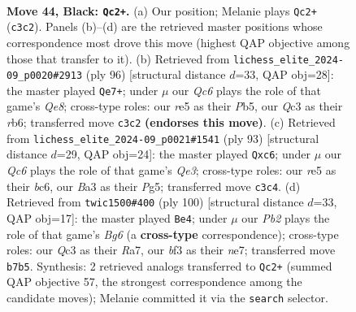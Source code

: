 \documentclass[11pt]{article}
\begin{document}
\clearpage

\begin{figure}[p]\centering
\begin{subfigure}{0.46\textwidth}\centering
\resizebox{\linewidth}{!}{%
\newchessgame
\chessboard[
  setfen={8/pp6/6pk/4R3/5P1P/b1q2B2/5K2/8 b - - 1 44},
  showmover=false,
  pgfstyle=straightmove, color=movearrow, markmove={c3-c2}
]}
\caption{}
\end{subfigure}\hfill
\begin{subfigure}{0.46\textwidth}\centering
\resizebox{\linewidth}{!}{%
\newchessgame
\chessboard[
  setfen={1b2Q3/6k1/1r6/1P3p2/5P2/5KP1/8/8 w - - 0 49},
  showmover=false,
  pgfstyle=straightmove, color=movearrow, markmove={e8-e7}
]}
\caption{}
\end{subfigure}
\\[4pt]
\begin{subfigure}{0.46\textwidth}\centering
\resizebox{\linewidth}{!}{%
\newchessgame
\chessboard[
  setfen={8/6kp/2B1q3/P5p1/1p6/5p2/P2K1R2/8 b - - 2 47},
  showmover=false,
  pgfstyle=straightmove, color=movearrow, markmove={e6-c6}
]}
\caption{}
\end{subfigure}\hfill
\begin{subfigure}{0.46\textwidth}\centering
\resizebox{\linewidth}{!}{%
\newchessgame
\chessboard[
  setfen={5k2/R3n3/4p1B1/4P1p1/3r4/5KP1/8/8 w - - 7 51},
  showmover=false,
  pgfstyle=straightmove, color=movearrow, markmove={g6-e4}
]}
\caption{}
\end{subfigure}
\caption{\textbf{Move 44, Black: \texttt{Qc2+}.} (a) Our position; Melanie plays \texttt{Qc2+} (\texttt{c3c2}). Panels (b)--(d) are the retrieved master positions whose correspondence most drove this move (highest QAP objective among those that transfer to it). (b) Retrieved from \texttt{lichess\_elite\_2024-09\_p0020\#2913} (ply 96) [structural distance $d$=33, QAP obj=28]: the master played \texttt{Qe7+}; under $\mu$ our \emph{Qc6} plays the role of that game's \emph{Qe8}; cross-type roles: our \emph{r}e5 as their \emph{P}b5, our \emph{Q}c3 as their \emph{r}b6; transferred move \texttt{c3c2} \textbf{(endorses this move)}. (c) Retrieved from \texttt{lichess\_elite\_2024-09\_p0021\#1541} (ply 93) [structural distance $d$=29, QAP obj=24]: the master played \texttt{Qxc6}; under $\mu$ our \emph{Qc6} plays the role of that game's \emph{Qe3}; cross-type roles: our \emph{r}e5 as their \emph{b}c6, our \emph{B}a3 as their \emph{P}g5; transferred move \texttt{c3c4}. (d) Retrieved from \texttt{twic1500\#400} (ply 100) [structural distance $d$=33, QAP obj=17]: the master played \texttt{Be4}; under $\mu$ our \emph{Pb2} plays the role of that game's \emph{Bg6} (a \textbf{cross-type} correspondence); cross-type roles: our \emph{Q}c3 as their \emph{R}a7, our \emph{b}f3 as their \emph{n}e7; transferred move \texttt{b7b5}. Synthesis: 2 retrieved analogs transferred to \texttt{Qc2+} (summed QAP objective 57, the strongest correspondence among the candidate moves); Melanie committed it via the \texttt{search} selector.}
\label{fig:thought-m87}
\end{figure}
\end{document}
